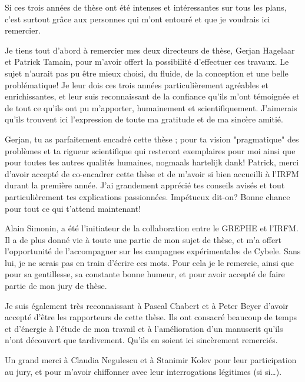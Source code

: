 \thispagestyle{preface}
 
Si ces trois années de thèse ont été intenses et intéressantes sur tous
les plans, c'est surtout grâce aux personnes qui m’ont entouré et que je
voudrais ici remercier.

Je tiens tout d'abord à remercier mes deux directeurs de thèse, Gerjan Hagelaar
et Patrick Tamain, pour m'avoir offert la possibilité d'effectuer ces travaux.
Le sujet n'aurait pas pu être mieux choisi, du fluide, de la conception et une
belle problématique! Je leur dois ces trois années
particulièrement agréables et enrichissantes, et leur suis reconnaissant de la
confiance qu'ils m'ont témoignée et de tout ce qu'ils ont pu m'apporter,
humainement et scientifiquement. J'aimerais qu'ils trouvent ici l'expression de toute ma
gratitude et de ma sincère amitié. 

Gerjan, tu as parfaitement encadré cette
thèse ; pour ta vision "pragmatique" des problèmes et ta rigueur
scientifique qui resteront exemplaires pour moi ainsi que pour toutes tes autres
qualités humaines, nogmaals hartelijk dank!
Patrick, merci d'avoir accepté de co-encadrer cette thèse et de m'avoir si bien
accueilli à l'IRFM durant la première année. J'ai grandement apprécié tes
conseils avisés et tout particulièrement tes explications passionnées.
Impétueux dit-on? Bonne chance pour tout ce qui t'attend maintenant!

Alain Simonin, a été l'initiateur de la collaboration entre le GREPHE et
l'IRFM. Il a de plus donné vie à toute une partie de mon sujet de
thèse, et m'a offert l'opportunité de l'accompagner sur les campagnes
expérimentales de Cybele. Sans lui, je ne serais pas en train d'écrire ces mots.
Pour cela je le remercie, ainsi que pour sa gentillesse, sa constante bonne
humeur, et pour avoir accepté de faire partie de mon jury de thèse.

Je suis également très reconnaissant à Pascal Chabert et à Peter Beyer d'avoir
accepté d'être les rapporteurs de cette thèse. Ils ont consacré
beaucoup de temps et d'énergie à l'étude de mon travail et à l'amélioration d'un
manuscrit qu'ils n'ont découvert que tardivement. Qu'ils en soient ici
sincèrement remerciés.

Un grand merci à Claudia Negulescu et à Stanimir Kolev pour leur participation
au jury, et pour m'avoir chiffonner avec leur interrogations légitimes (si
si\ldots).


